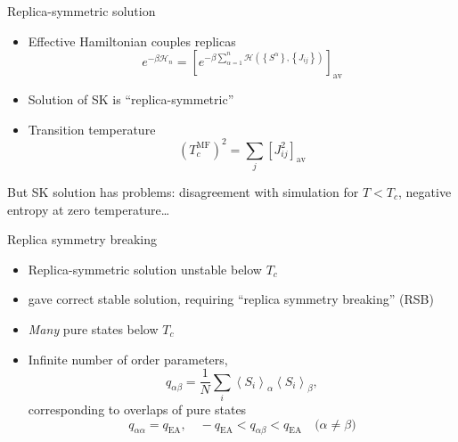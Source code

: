 \documentclass{beamer}
\newcommand{\av}[1]{\left<#1\right>}
\newcommand{\cbr}[1]{\left\{#1\right\}}
\newcommand{\del}[1]{\left(#1\right)}
\newcommand{\sbr}[1]{\left[#1\right]}
\newcommand{\dav}[1]{\sbr{#1}_{\text{av}}}
\newcommand{\ham}{\mathcal{H}}
\newcommand{\qea}{q_{\text{EA}}}
\begin{document}
\begin{frame}{Replica-symmetric solution}
  \begin{itemize}
    \item Effective Hamiltonian couples replicas
      \begin{equation*}
        e^{-\beta\ham_n}=
        \dav{e^{-\beta\sum_{\alpha=1}^n \ham\del{\cbr{S^{\alpha}},\cbr{J_{ij}}}}}
      \end{equation*}
    \item Solution of SK is ``replica-symmetric''
    \item Transition temperature
      \begin{equation*}
        \del{T_c^{\text{MF}}}^2 = \sum_j \dav{J_{ij}^2}
      \end{equation*}
  \end{itemize}
  But SK solution has problems: disagreement with simulation for $T<T_c$,
  \alert{negative} entropy at zero temperature\dots
\end{frame}

\begin{frame}{Replica symmetry breaking}
  \begin{itemize}
    \item Replica-symmetric solution \alert{unstable} below $T_c$
    \item \textcite{parisi1979infinite} gave correct stable solution,
      requiring ``replica symmetry breaking'' (RSB)
    \item \emph{Many} pure states below $T_c$
    \item Infinite number of order parameters,
      \begin{equation*}
        q_{\alpha\beta} = \frac{1}{N} \sum_i \av{S_i}_{\alpha} \av{S_i}_{\beta},
      \end{equation*}
      corresponding to \alert{overlaps} of pure states
      \begin{equation*}
        q_{\alpha\alpha}=\qea,\quad
        -\qea < q_{\alpha\beta} < \qea
        \quad\text{($\alpha\neq\beta$)}
      \end{equation*}
  \end{itemize}
\end{frame}
\end{document}
